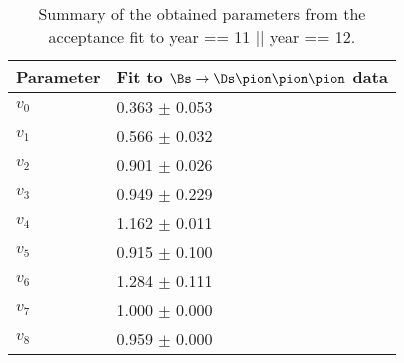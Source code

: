 \begin{table}[h]
\centering
\begin{tabular}{l l}
Parameter & Fit to $\Bs\to\Ds\pion\pion\pion$ data \\
\hline
$v_{0}$ & 0.363 $\pm$ 0.053\\
$v_{1}$ & 0.566 $\pm$ 0.032\\
$v_{2}$ & 0.901 $\pm$ 0.026\\
$v_{3}$ & 0.949 $\pm$ 0.229\\
$v_{4}$ & 1.162 $\pm$ 0.011\\
$v_{5}$ & 0.915 $\pm$ 0.100\\
$v_{6}$ & 1.284 $\pm$ 0.111\\
$v_{7}$ & 1.000 $\pm$ 0.000\\
$v_{8}$ & 0.959 $\pm$ 0.000\\
\end{tabular}
\caption{Summary of the obtained parameters from the acceptance fit to  year == 11 || year == 12.} 
\label{table: Splines}
\end{table}
